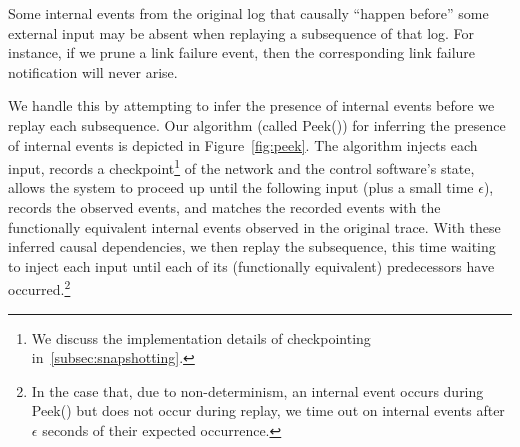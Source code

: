  Some internal events from the original
log that causally ``happen before'' some external input
may be absent when replaying a subsequence of that log.
For instance, if we prune a link failure event, then
the corresponding link failure notification will never arise.

We handle this by attempting to infer the presence of internal
events before we replay each subsequence. Our algorithm (called {\sc Peek()}) for inferring the
presence of internal events is depicted in
Figure~\ref{fig:peek}. The algorithm injects each input, records a checkpoint\footnote{We discuss the implementation details of checkpointing
in~\ref{subsec:snapshotting}.} of
the network and the control software's state, allows the system to proceed up
until the following input (plus a small time $\epsilon$), records the observed
events, and matches the
recorded events with the functionally equivalent internal events observed in
the original trace. With these inferred causal dependencies, we then replay
the subsequence, this time waiting to inject each input until each of its
(functionally equivalent) predecessors have occurred.\footnote{In the
case that, due
to non-determinism, an internal event occurs during {\sc Peek()} but does not occur
during replay, we time out on internal events after $\epsilon$ seconds of
their expected occurrence.}


